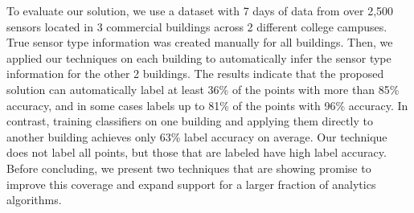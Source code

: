 To evaluate our solution, we use a dataset with 7 days of data from over 2,500
sensors located in 3 commercial buildings across 2 different college
campuses. True sensor type information was created manually for all buildings. Then, we applied our
techniques on each building to automatically infer the sensor type information for the other 2
buildings. The results indicate that the proposed solution can automatically label at
least 36\% of the points with more than 85\% accuracy, and in some cases labels
up to 81\% of the points with 96\% accuracy. In contrast, training classifiers
on one building and applying them directly to another building 
achieves only 63\% label accuracy on average. Our technique does not label all
points, but those that are labeled have high label accuracy. %
Before concluding, we present two techniques that are showing promise
to improve this coverage and expand support for a larger fraction of analytics
algorithms.
